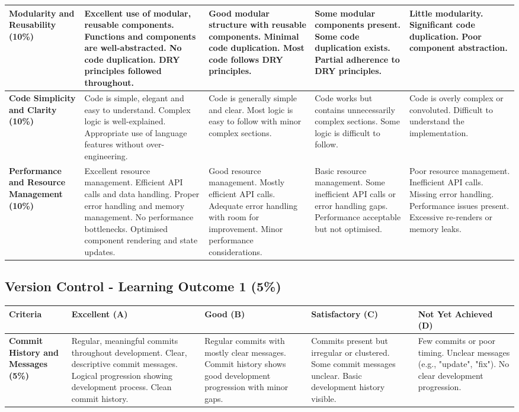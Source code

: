 \documentclass{article}
\begin{document}
\begin{landscape}
\begin{tabular}{|p{5cm}|p{4cm}|p{4cm}|p{4cm}|p{4cm}|}
\textbf{Modularity and Reusability (10\%)} & 
Excellent use of modular, reusable components. Functions and components are well-abstracted. No code duplication. DRY principles followed throughout. & 
Good modular structure with reusable components. Minimal code duplication. Most code follows DRY principles. & 
Some modular components present. Some code duplication exists. Partial adherence to DRY principles. & 
Little modularity. Significant code duplication. Poor component abstraction. \\ \hline

\textbf{Code Simplicity and Clarity (10\%)} & 
Code is simple, elegant and easy to understand. Complex logic is well-explained. Appropriate use of language features without over-engineering. & 
Code is generally simple and clear. Most logic is easy to follow with minor complex sections. & 
Code works but contains unnecessarily complex sections. Some logic is difficult to follow. & 
Code is overly complex or convoluted. Difficult to understand the implementation. \\ \hline

\textbf{Performance and Resource Management (10\%)} & 
Excellent resource management. Efficient API calls and data handling. Proper error handling and memory management. No performance bottlenecks. Optimised component rendering and state updates. & 
Good resource management. Mostly efficient API calls. Adequate error handling with room for improvement. Minor performance considerations. & 
Basic resource management. Some inefficient API calls or error handling gaps. Performance acceptable but not optimised. & 
Poor resource management. Inefficient API calls. Missing error handling. Performance issues present. Excessive re-renders or memory leaks. \\ \hline

\end{tabular}

\subsection*{Version Control - Learning Outcome 1 (5\%)}

\begin{tabular}{|p{5cm}|p{4cm}|p{4cm}|p{4cm}|p{4cm}|}
\hline
\textbf{Criteria} & \textbf{Excellent (A)} & \textbf{Good (B)} & \textbf{Satisfactory (C)} & \textbf{Not Yet Achieved (D)} \\ \hline

\textbf{Commit History and Messages (5\%)} & 
Regular, meaningful commits throughout development. Clear, descriptive commit messages. Logical progression showing development process. Clean commit history. & 
Regular commits with mostly clear messages. Commit history shows good development progression with minor gaps. & 
Commits present but irregular or clustered. Some commit messages unclear. Basic development history visible. & 
Few commits or poor timing. Unclear messages (e.g., "update", "fix"). No clear development progression. \\ \hline


\end{tabular}
\end{landscape}
\end{document}
